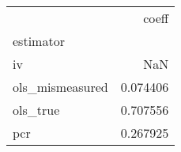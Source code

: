 \begin{tabular}{lr}
\toprule
{} &     coeff \\
estimator       &           \\
\midrule
iv              &       NaN \\
ols\_mismeasured &  0.074406 \\
ols\_true        &  0.707556 \\
pcr             &  0.267925 \\
\bottomrule
\end{tabular}
